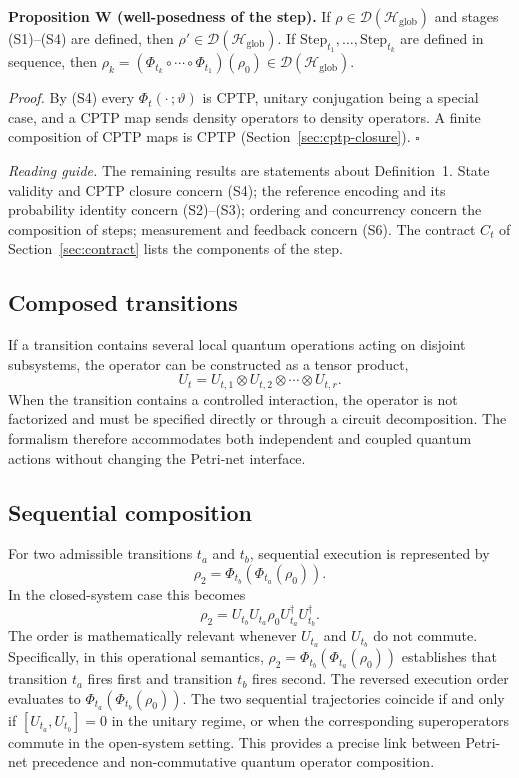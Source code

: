 \documentclass[final,3p,times]{elsarticle}
\begin{document}
\noindent\textbf{Proposition W (well-posedness of the step).} If $\rho\in\mathcal D(\mathcal H_{\mathrm{glob}})$ and stages (S1)--(S4) are defined, then $\rho'\in\mathcal D(\mathcal H_{\mathrm{glob}})$. If $\mathrm{Step}_{t_1},\ldots,\mathrm{Step}_{t_k}$ are defined in sequence, then $\rho_k=(\Phi_{t_k}\circ\cdots\circ\Phi_{t_1})(\rho_0)\in\mathcal D(\mathcal H_{\mathrm{glob}})$.

\noindent\textit{Proof.} By (S4) every $\Phi_t(\cdot\,;\vartheta)$ is CPTP, unitary conjugation being a special case, and a CPTP map sends density operators to density operators. A finite composition of CPTP maps is CPTP (Section~\ref{sec:cptp-closure}). $\square$

\noindent\textit{Reading guide.} The remaining results are statements about Definition~1. State validity and CPTP closure concern (S4); the reference encoding and its probability identity concern (S2)--(S3); ordering and concurrency concern the composition of steps; measurement and feedback concern (S6). The contract $C_t$ of Section~\ref{sec:contract} lists the components of the step.

\subsection{Composed transitions}

If a transition contains several local quantum operations acting on disjoint subsystems, the operator can be constructed as a tensor product,
\begin{equation}
    U_t=U_{t,1}\otimes U_{t,2}\otimes\cdots\otimes U_{t,r}.
\end{equation}
When the transition contains a controlled interaction, the operator is not factorized and must be specified directly or through a circuit decomposition. The formalism therefore accommodates both independent and coupled quantum actions without changing the Petri-net interface.

\subsection{Sequential composition}

For two admissible transitions $t_a$ and $t_b$, sequential execution is represented by
\begin{equation}
    \rho_2=\Phi_{t_b}\!\left(\Phi_{t_a}(\rho_0)\right).
\end{equation}
In the closed-system case this becomes
\begin{equation}
    \rho_2=U_{t_b}U_{t_a}\rho_0U_{t_a}^\dagger U_{t_b}^\dagger.
\end{equation}
The order is mathematically relevant whenever $U_{t_a}$ and $U_{t_b}$ do not commute. Specifically, in this operational semantics, $\rho_2=\Phi_{t_b}(\Phi_{t_a}(\rho_0))$ establishes that transition $t_a$ fires first and transition $t_b$ fires second. The reversed execution order evaluates to $\Phi_{t_a}(\Phi_{t_b}(\rho_0))$. The two sequential trajectories coincide if and only if $[U_{t_a},U_{t_b}]=0$ in the unitary regime, or when the corresponding superoperators commute in the open-system setting. This provides a precise link between Petri-net precedence and non-commutative quantum operator composition.
\end{document}
